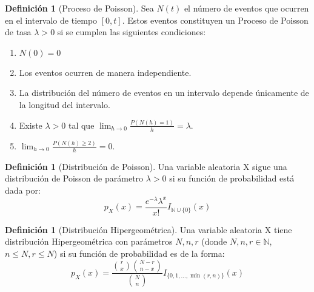 \documentclass[11pt]{article}
\theoremstyle{definition} %
\newtheorem{definition}[theorem]{Definición}
\begin{document}
\begin{definition}[Proceso de Poisson]
Sea $N(t)$ el número de eventos que ocurren en el intervalo de tiempo $[0, t]$. Estos eventos constituyen un Proceso de Poisson de tasa $\lambda > 0$ si se cumplen las siguientes condiciones:
\begin{enumerate}
    \item $N(0)=0$
    \item Los eventos ocurren de manera independiente.
    \item La distribución del número de eventos en un intervalo depende únicamente de la longitud del intervalo.
    \item Existe $\lambda > 0$ tal que $\lim_{h \to 0} \frac{P(N(h)=1)}{h} = \lambda$.
    \item $\lim_{h \to 0} \frac{P(N(h)\ge 2)}{h} = 0$.
\end{enumerate}
\end{definition}

\begin{definition}[Distribución de Poisson]
Una variable aleatoria X sigue una distribución de Poisson de parámetro $\lambda > 0$ si su función de probabilidad está dada por:
$$ p_{X}(x) = \frac{e^{-\lambda} \lambda^{x}}{x!} I_{\mathbb{N} \cup \{0\}}(x) $$
\end{definition}

\begin{definition}[Distribución Hipergeométrica]
Una variable aleatoria X tiene distribución Hipergeométrica con parámetros $N, n, r$ (donde $N,n,r \in \mathbb{N}$, $n \le N, r \le N$) si su función de probabilidad es de la forma:
$$ p_{X}(x) = \frac{\binom{r}{x} \binom{N-r}{n-x}}{\binom{N}{n}} I_{\{0, 1, \dots, \min(r,n)\}}(x) $$
\end{definition}
\end{document}
